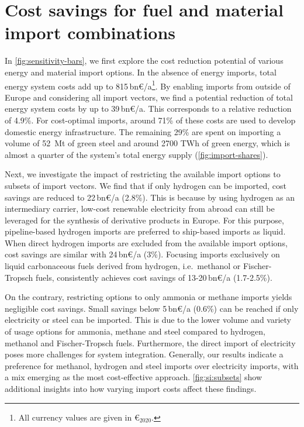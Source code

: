 \documentclass[5p,10pt]{elsarticle}
\newcommand{\bneuro}[1]{#1\,bn\euro{}/a}
\begin{document}
\section*{Cost savings for fuel and material import combinations}

In \cref{fig:sensitivity-bars}, we first explore the cost reduction potential of
various energy and material import options. In the absence of energy imports,
total energy system costs add up to \bneuro{815}\footnote{All currency values
are given in \euro{}$_{2020}$.}. By enabling imports from outside of Europe and
considering all import vectors, we find a potential reduction of total energy
system costs by up to \bneuro{39}. This corresponds to a relative reduction of
4.9\%. For cost-optimal imports, around 71\% of these costs are used to develop
domestic energy infrastructure. The remaining 29\% are spent on importing a
volume of 52~Mt of green steel and around 2700 TWh of green energy, which is
almost a quarter of the system's total energy supply (\cref{fig:import-shares}).

Next, we investigate the impact of restricting the available import options to
subsets of import vectors. We find that if only hydrogen can be imported, cost
savings are reduced to \bneuro{22} (2.8\%). This is because by using hydrogen as
an intermediary carrier, low-cost renewable electricity from abroad can still be
leveraged for the synthesis of derivative products in Europe. For this purpose,
pipeline-based hydrogen imports are preferred to ship-based imports as liquid.
When direct hydrogen imports are excluded from the available import options,
cost savings are similar with \bneuro{24} (3\%). Focusing imports exclusively on
liquid carbonaceous fuels derived from hydrogen, i.e.~methanol or Fischer-Tropsch
fuels, consistently achieves cost savings of \bneuro{13-20} (1.7-2.5\%).

On the contrary, restricting options to only ammonia or methane imports yields
negligible cost savings. Small savings below \bneuro{5} (0.6\%) can be reached
if only electricity or steel can be imported. This is due to the lower volume
and variety of usage options for ammonia, methane and steel compared to
hydrogen, methanol and Fischer-Tropsch fuels. Furthermore, the direct import of
electricity poses more challenges for system integration. Generally, our results
indicate a preference for methanol, hydrogen and steel imports over electricity
imports, with a mix emerging as the most cost-effective approach.
\cref{fig:si:subsets} show additional insights into how varying import costs
affect these findings.
\end{document}

